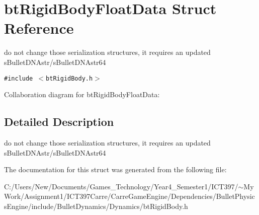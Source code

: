 \hypertarget{structbt_rigid_body_float_data}{
\section{btRigidBodyFloatData Struct Reference}
\label{structbt_rigid_body_float_data}
}
do not change those serialization structures, it requires an updated sBulletDNAstr/sBulletDNAstr64  


{\tt \#include $<$btRigidBody.h$>$}

Collaboration diagram for btRigidBodyFloatData:

\subsection{Detailed Description}
do not change those serialization structures, it requires an updated sBulletDNAstr/sBulletDNAstr64 

The documentation for this struct was generated from the following file:\begin{CompactItemize}
\item 
C:/Users/New/Documents/Games\_\-Technology/Year4\_\-Semester1/ICT397/$\sim$My Work/Assignment1/ICT397Carre/CarreGameEngine/Dependencies/BulletPhysicsEngine/include/BulletDynamics/Dynamics/btRigidBody.h\end{CompactItemize}
